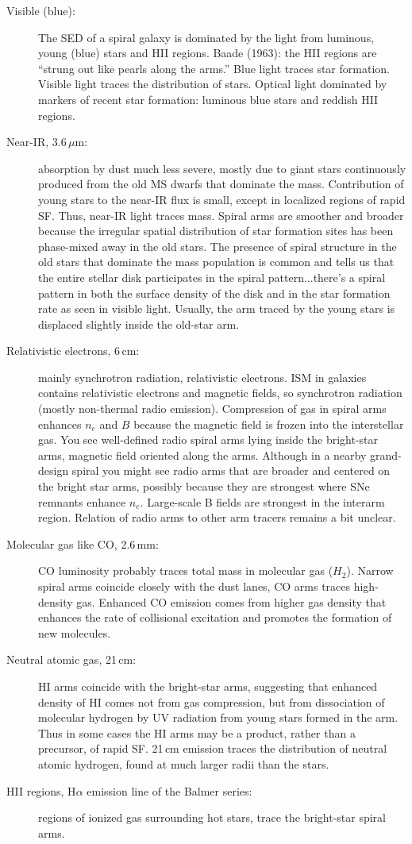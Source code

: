 \documentclass[12pt, letterpaper, preprint]{aastex}
\begin{document}
\begin{enumerate}
\begin{description}
\item[Visible (blue):] The SED of a spiral galaxy is dominated by the light from luminous, young (blue) stars and HII regions. Baade (1963): the HII regions are ``strung out like pearls along the arms.'' Blue light traces star formation. Visible light traces the distribution of stars. Optical light dominated by markers of recent star formation: luminous blue stars and reddish HII regions.
\item[Near-IR, $3.6\,\mu$m:] absorption by dust much less severe, mostly due to giant stars continuously produced from the old MS dwarfs that dominate the mass. Contribution of young stars to the near-IR flux is small, except in localized regions of rapid SF. Thus, near-IR light traces mass. Spiral arms are smoother and broader because the irregular spatial distribution of star formation sites has been phase-mixed away in the old stars. The presence of spiral structure in the old stars that dominate the mass population is common and tells us that the entire stellar disk participates in the spiral pattern...there's a spiral pattern in both the surface density of the disk and in the star formation rate as seen in visible light. Usually, the arm traced by the young stars is displaced slightly inside the old-star arm. 
\item[Relativistic electrons, 6\,cm:] mainly synchrotron radiation, relativistic electrons. ISM in galaxies contains relativistic electrons and magnetic fields, so synchrotron radiation (mostly non-thermal radio emission). Compression of gas in spiral arms enhances $n_e$ and $B$ because the magnetic field is frozen into the interstellar gas. You see well-defined radio spiral arms lying inside the bright-star arms, magnetic field oriented along the arms. Although in a nearby grand-design spiral you might see radio arms that are broader and centered on the bright star arms, possibly because they are strongest where SNe remnants enhance $n_e$. Large-scale B fields are strongest in the interarm region. Relation of radio arms to other arm tracers remains a bit unclear. 
\item[Molecular gas like CO, 2.6\,mm:] CO luminosity probably traces total mass in molecular gas ($H_2$).
Narrow spiral arms coincide closely with the dust lanes, CO arms traces high-density gas. Enhanced CO emission comes from higher gas density that enhances the rate of collisional excitation and promotes the formation of new molecules.
\item[Neutral atomic gas, 21\,cm:] HI arms coincide with the bright-star arms, suggesting that enhanced density of HI comes not from gas compression, but from dissociation of molecular hydrogen by UV radiation from young stars formed in the arm. Thus in some cases the HI arms may be a product, rather than a precursor, of rapid SF. 21\,cm emission traces the distribution of neutral atomic hydrogen, found at much larger radii than the stars.
\item[HII regions, H$\alpha$ emission line of the Balmer series:] regions of ionized gas surrounding hot stars,
trace the bright-star spiral arms. 
\end{description} \newpage


\end{enumerate}
\end{document}
